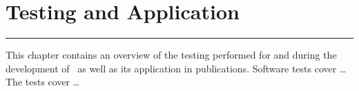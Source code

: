 \chapter{Testing and Application}

\hrule

This chapter contains an overview of the testing performed for and during the development of \stops\ as well as its application in publications.
Software tests cover \dots %
The tests cover \dots

